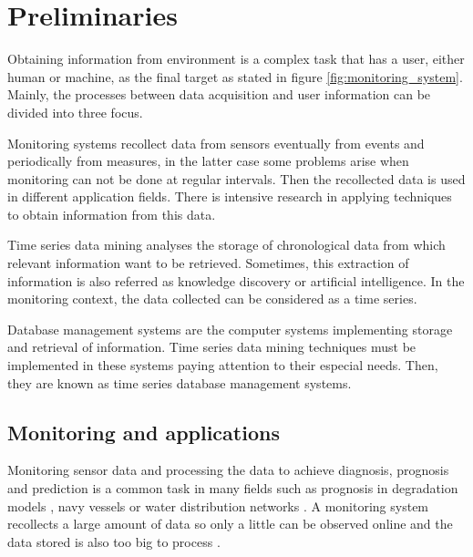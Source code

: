 
\section{Preliminaries}

Obtaining information from environment is a complex task that has a user, either human or machine, as the final target as stated in figure \ref{fig:monitoring_system}. Mainly, the processes between data acquisition and user information can be divided into three focus.


Monitoring systems recollect data from sensors eventually from events and periodically from measures, in the latter case some problems arise when monitoring can not be done at regular intervals. Then the recollected data is used in different application fields. There is intensive research in applying techniques to obtain information from this data.

Time series data mining analyses the storage of chronological data from which relevant information want to be retrieved. Sometimes, this extraction of information is also referred as knowledge discovery or artificial intelligence.
In the monitoring context, the data collected can be considered as a time series.

Database management systems are the computer systems implementing storage and retrieval of information. Time series data mining techniques must be implemented in these systems paying attention to their especial needs. Then, they are known as time series database management systems.



\subsection{Monitoring and applications}

Monitoring sensor data and processing the data to achieve diagnosis,
prognosis and prediction is a common task in many fields such as
prognosis in degradation models \parencite{yu11}, navy
vessels \parencite{palmer07} or water distribution
networks \parencite{quevedo10}.  A monitoring system recollects a
large amount of data so only a little can be observed online and the
data stored is also too big to process \parencite{keogh97}.

